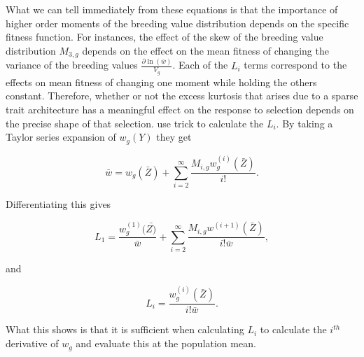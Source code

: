 What we can tell immediately from these equations is that the importance of
higher order moments of the breeding value distribution depends on the specific
fitness function. For instances, the effect of the skew of the breeding value
distribution $M_{3,g}$ depends on the effect on the mean fitness of changing the
variance of the breeding values $\frac{\partial \ln(\bar{w})}{V_g}$. Each of the
$L_i$ terms correspond to the effects on mean fitness of changing one moment
while holding the others constant. Therefore, whether or not the excess kurtosis
that arises due to a sparse trait architecture has a meaningful effect on the
response to selection depends on the precise shape of that selection.
\citet{Turelli1990} use trick to calculate the $L_i$. By taking a Taylor series
expansion of $w_g(Y)$ they get

\begin{equation}
  \label{eq:wbar}
  \bar{w} = w_g(\bar{Z}) + \sum_{i=2}^\infty \frac{M_{i,g}w^{(i)}_g(\bar{Z})}{i!}.
\end{equation}

Differentiating this gives

\begin{equation}
  \label{eq:l1}
  L_1= \frac{w_g^{(1)}(\bar{Z)}}{\bar{w}} + \sum_{i=2}^\infty \frac{ M_{i,g}w^{(i+1)}( \bar{Z} ) }{ i! \bar{w} },
\end{equation}

and

\begin{equation}
  \label{eq:li}
  L_i = \frac{w_g^{(i)}(\bar{Z})}{i!\bar{w}}.
\end{equation}

What this shows is that it is sufficient when calculating $L_i$ to calculate the
$i^{th}$ derivative of $w_g$ and evaluate this at the population mean.

